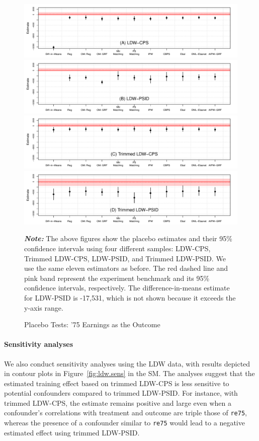\documentclass[letterpaper,12pt,leqno]{article}
\begin{document}
\begin{figure}[!ht]
    \caption{Placebo Tests: '75 Earnings as the Outcome}\label{fig:ldw.placebo}
    \vspace{-1em}
    \begin{minipage}[c]{1\textwidth}
    \begin{center}
    \includegraphics[width=0.8\linewidth]{coef_ldwp_cps.pdf}
    \includegraphics[width=0.8\linewidth]{coef_ldwp_psid.pdf}
    \includegraphics[width=0.8\linewidth]{coef_ldwp_cps_trim.pdf}
    \includegraphics[width=0.8\linewidth]{coef_ldwp_psid_trim.pdf}
    \end{center}    
     {\footnotesize\textbf{\textit{Note:}} The above figures show the placebo estimates and their 95\% confidence intervals using four different samples: LDW-CPS, Trimmed LDW-CPS, LDW-PSID, and Trimmed LDW-PSID. We use the same eleven estimators as before. The red dashed line and pink band represent the experiment benchmark and its 95\% confidence intervals, respectively. The difference-in-means estimate for LDW-PSID is -17,531, which is not shown because it exceeds the y-axis range.}
     \end{minipage}
\end{figure}

\paragraph{Sensitivity analyses} We also conduct sensitivity analyses using the LDW data, with results depicted in contour plots in Figure~\ref{fig:ldw.sens} in the SM. The analyses suggest that the estimated training effect based on trimmed LDW-CPS is less sensitive to potential confounders compared to trimmed LDW-PSID. For instance, with trimmed LDW-CPS, the estimate remains positive and large even when a confounder's correlations with treatment and outcome are triple those of \texttt{re75}, whereas the presence of a confounder similar to \texttt{re75} would lead to a negative estimated effect using trimmed LDW-PSID.
\end{document}
